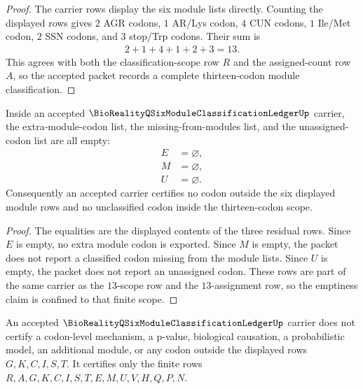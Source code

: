 \begin{proof}
The carrier rows display the six module lists directly. Counting the displayed rows gives $2$ AGR codons, $1$ AR/Lys codon, $4$ CUN codons, $1$ Ile/Met codon, $2$ SSN codons, and $3$ stop/Trp codons. Their sum is
$$
\begin{aligned}
2+1+4+1+2+3=13.
\end{aligned}
$$
This agrees with both the classification-scope row $R$ and the assigned-count row $A$, so the accepted packet records a complete thirteen-codon module classification.
\end{proof}

\begin{theorem}
\label{thm:bioreality-q-six-module-classification-ledger-residual-emptiness}
Inside an accepted $\BioRealityQSixModuleClassificationLedgerUp$ carrier, the extra-module-codon list, the missing-from-modules list, and the unassigned-codon list are all empty:
$$
\begin{aligned}
E&=\varnothing,\\
M&=\varnothing,\\
U&=\varnothing.
\end{aligned}
$$
Consequently an accepted carrier certifies no codon outside the six displayed module rows and no unclassified codon inside the thirteen-codon scope.
\end{theorem}

\begin{proof}
The equalities are the displayed contents of the three residual rows. Since $E$ is empty, no extra module codon is exported. Since $M$ is empty, the packet does not report a classified codon missing from the module lists. Since $U$ is empty, the packet does not report an unassigned codon. These rows are part of the same carrier as the $13$-scope row and the $13$-assignment row, so the emptiness claim is confined to that finite scope.
\end{proof}

\begin{theorem}
\label{thm:bioreality-q-six-module-classification-ledger-nonescape}
An accepted $\BioRealityQSixModuleClassificationLedgerUp$ carrier does not certify a codon-level mechanism, a p-value, biological causation, a probabilistic model, an additional module, or any codon outside the displayed rows $G,K,C,I,S,T$. It certifies only the finite rows $R,A,G,K,C,I,S,T,E,M,U,V,H,Q,P,N$.
\end{theorem}

